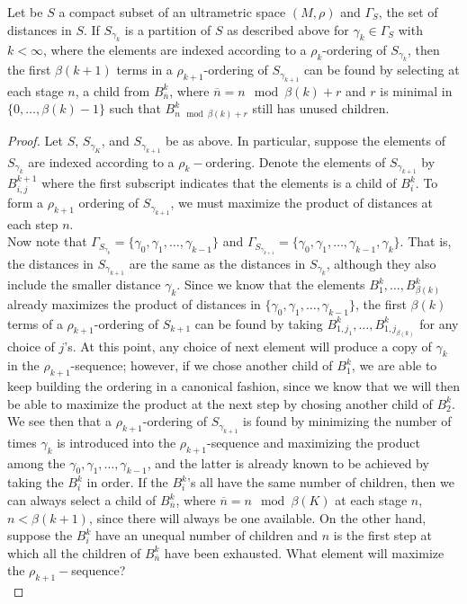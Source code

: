 \begin{proposition*} 
Let be $S$ a compact subset of an ultrametric space $(M, \rho)$ and $\Gamma_S$, the set of distances in $S$. If $S_{\gamma_k}$ is a partition of $S$ as described above for $\gamma_k \in \Gamma_S$ with $k < \infty$, where the elements are indexed according to a $\rho_k$-ordering of $S_{\gamma_k}$, then the first $\beta(k+1)$ terms in a $\rho_{k+1}$-ordering of $S_{\gamma_{k+1}}$ can be found by selecting at each stage $n$, a child from $B^k_\overline{n}$, where $\overline{n} = n \mod \beta(k) +r $ and $r$ is minimal in $\{0,\ldots,\beta(k)-1\}$ such that $B^k_{n \mod \beta(k) +r}$ still has unused children.

\begin{proof}
Let $S$, $S_{\gamma_K}$, and $S_{\gamma_{k+1}}$ be as above. In particular, suppose the elements of $S_{\gamma_k}$ are indexed according to a $\rho_k-$ordering. Denote the elements of $S_{\gamma_{k+1}}$ by $B^{k+1}_{i,j}$ where the first subscript indicates that the elements is a child of $B^k_i$. To form a $\rho_{k+1}$ ordering of $S_{\gamma_{k+1}}$, we must maximize the product of distances at each step $n$.\\

Now note that $\Gamma_{S_{\gamma_k}} = \{\gamma_0, \gamma_1,\ldots, \gamma_{k-1}\}$ and $\Gamma_{S_{\gamma_{k+1}}} = \{\gamma_0, \gamma_1,\ldots, \gamma_{k-1}, \gamma_{k}\}$. That is, the distances in $S_{\gamma_{k+1}}$ are the same as the distances in $S_{\gamma_k}$, although they also include the smaller distance $\gamma_k$. Since we know that the elements $B^k_1,\ldots,B^k_{\beta(k)}$ already maximizes the product of distances in $\{\gamma_0, \gamma_1,\ldots, \gamma_{k-1}\}$, the first $\beta(k)$ terms of a $\rho_{k+1}$-ordering of $S_{k+1}$ can be found by taking $B^k_{1,j_1},\ldots, B^k_{1,j_{\beta(k)}}$ for any choice of $j$'s. At this point, any choice of next element will produce a copy of $\gamma_k$ in the $\rho_{k+1}$-sequence; however, if we chose another child of $B^k_{1}$, we are able to keep building the ordering in a canonical fashion, since we know that we will then be able to maximize the product at the next step by chosing another child of $B^k_{2}$.\\

We see then that a $\rho_{k+1}$-ordering of $S_{\gamma_{k+1}}$ is found by minimizing the number of times $\gamma_k$ is introduced into the $\rho_{k+1}$-sequence and maximizing the product among the $\gamma_0, \gamma_1,\ldots, \gamma_{k-1}$, and the latter is already known to be achieved by taking the $B^k_i$ in order.  If the $B^k_i$'s all have the same number of children, then we can always select a child of $B^k_\overline{n}$, where $\overline{n} = n \mod \beta(K)$ at each stage $n$, $n < \beta(k+1)$, since there will always be one available. On the other hand, suppose the $B^k_i$ have an unequal number of children and $n$ is the first step at which all the children of $B^k_{\overline{n}}$ have been exhausted. What element will maximize the $\rho_{k+1}-$sequence?\\


\end{proof}
\end{proposition*}
